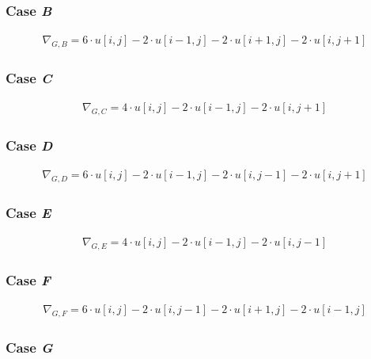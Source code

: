 \documentclass[a4paper]{scrreprt}
\begin{document}
\subsubsection{Case \emph{B}}

\begin{align*}
		\nabla_{G, B} = 
		  6 \cdot u[i, j] - 2 \cdot u[i - 1, j] - 2 \cdot u[i + 1, j] - 2 \cdot u[i, j + 1]
\end{align*}

\subsubsection{Case \emph{C}}

\begin{align*}
		\nabla_{G, C} =
		  4 \cdot u[i, j] - 2 \cdot u[i - 1, j] - 2 \cdot u[i, j + 1]
\end{align*}

\subsubsection{Case \emph{D}}

\begin{align*}
		\nabla_{G, D} = 
		  6 \cdot u[i, j] - 2 \cdot u[i - 1, j] - 2 \cdot u[i, j - 1] - 2 \cdot u[i, j + 1]
\end{align*}

\subsubsection{Case \emph{E}}

\begin{align*}
		\nabla_{G, E} =
		  4 \cdot u[i, j] - 2 \cdot u[i - 1, j] - 2 \cdot u[i, j - 1]
\end{align*}

\subsubsection{Case \emph{F}}

\begin{align*}
		\nabla_{G, F} =
		  6 \cdot u[i, j] - 2 \cdot u[i, j - 1] - 2 \cdot u[i + 1, j] - 2 \cdot u[i - 1, j]
\end{align*}

\subsubsection{Case \emph{G}}
\end{document}
